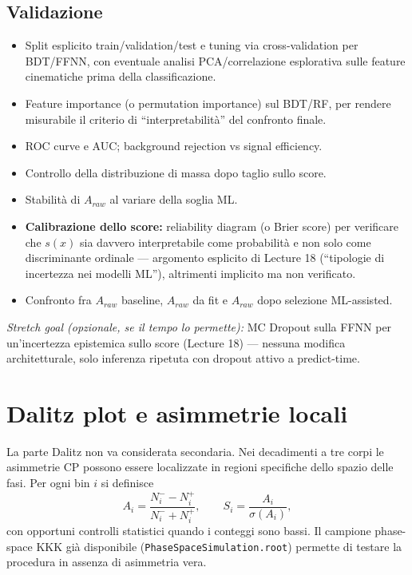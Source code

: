 \documentclass[11pt,a4paper]{article}
\begin{document}
\subsection*{Validazione}
\begin{itemize}[leftmargin=1.4em]
    \item Split esplicito train/validation/test e tuning via cross-validation per BDT/FFNN, con eventuale analisi PCA/correlazione esplorativa sulle feature cinematiche prima della classificazione.
    \item Feature importance (o permutation importance) sul BDT/RF, per rendere misurabile il criterio di ``interpretabilità'' del confronto finale.
    \item ROC curve e AUC; background rejection vs signal efficiency.
    \item Controllo della distribuzione di massa dopo taglio sullo score.
    \item Stabilità di $A_{raw}$ al variare della soglia ML.
    \item \textbf{Calibrazione dello score:} reliability diagram (o Brier score) per verificare che $s(x)$ sia davvero interpretabile come probabilità e non solo come discriminante ordinale --- argomento esplicito di Lecture 18 (``tipologie di incertezza nei modelli ML''), altrimenti implicito ma non verificato.
    \item Confronto fra $A_{raw}$ baseline, $A_{raw}$ da fit e $A_{raw}$ dopo selezione ML-assisted.
\end{itemize}

\noindent\emph{Stretch goal (opzionale, se il tempo lo permette):} MC Dropout sulla FFNN per un'incertezza epistemica sullo score (Lecture 18) --- nessuna modifica architetturale, solo inferenza ripetuta con dropout attivo a predict-time.

\section{Dalitz plot e asimmetrie locali}

La parte Dalitz non va considerata secondaria. Nei decadimenti a tre corpi le asimmetrie CP possono essere localizzate in regioni specifiche dello spazio delle fasi. Per ogni bin $i$ si definisce
\[
A_i = \frac{N_i^- - N_i^+}{N_i^- + N_i^+}, \qquad S_i = \frac{A_i}{\sigma(A_i)},
\]
con opportuni controlli statistici quando i conteggi sono bassi. Il campione phase-space KKK già disponibile (\texttt{PhaseSpaceSimulation.root}) permette di testare la procedura in assenza di asimmetria vera.
\end{document}
